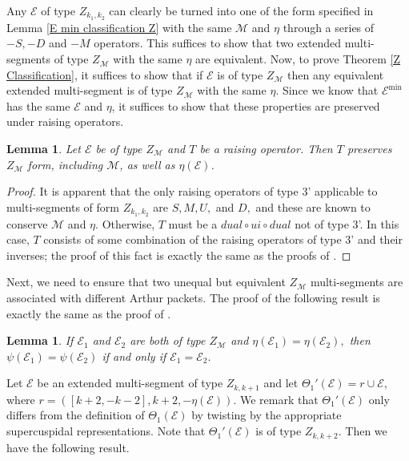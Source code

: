 \documentclass[11pt,letterpaper]{amsart}
\newcommand{\EE}{\mathcal{E}}
\newtheorem{lemma}[thm]{Lemma}
\numberwithin{equation}{section}
\begin{document}
Any $\mathcal{E}$ of type $Z_{k_1, k_2}$ can clearly be turned into one of the form specified in Lemma \ref{E min classification Z} with the same $\mathcal{M}$ and $\eta$ through a series of $-S, -D$ and $-M$ operators. This suffices to show that two extended multi-segments of type $Z_\mathcal{M}$ with the same $\eta$ are equivalent. Now, to prove Theorem \ref{Z Classification}, it suffices to show that if $\mathcal{E}$ is of type $Z_\mathcal{M}$ then any equivalent extended multi-segment is of type $Z_\mathcal{M}$ with the same $\eta.$ Since we know that $\mathcal{E}^{\min}$ has the same $\mathcal{E}$ and $\eta$, it suffices to show that these properties are preserved under raising operators.

\begin{lemma}
    Let $\mathcal{E}$ be of type $Z_\mathcal{M}$ and $T$ be a raising operator. Then $T$ preserves $Z_\mathcal{M}$ form, including $\mathcal{M}$, as well as $\eta(\mathcal{E})$.
\end{lemma}

\begin{proof}
    It is apparent that the only raising operators of type 3' applicable to multi-segments of form $Z_{k_1, k_2}$ are $S, M, U,$ and $D,$ and these are known to conserve $\mathcal{M}$ and $\eta.$ Otherwise, $T$ must be a $dual \circ ui \circ dual$ not of type 3'. In this case, $T$ consists of some combination of the raising operators of type 3' and their inverses; the proof of this fact is exactly the same as the proofs of \cite[Lemmas 5.47 and 5.48]{HKT26}.
\end{proof}

Next, we need to ensure that two unequal but equivalent $Z_\mathcal{M}$ multi-segments are associated with different Arthur packets. The proof of the following result is exactly the same as the proof of \cite[Lemma 6.1]{HKT26}.

\begin{lemma}
\label{packets distinct Z}
    If $\EE_1$ and $\EE_2$ are both of type $Z_\mathcal{M}$ and $\eta(\EE_1) = \eta(\EE_2),$ then $\psi(\EE_1) = \psi(\EE_2)$ if and only if $\EE_1 = \EE_2.$
\end{lemma}


Let $\mathcal{E}$ be an extended multi-segment of type $Z_{k, k + 1}$ and let $\Theta_1'(\mathcal{E}) = r \cup \mathcal{E},$ where $r = ([k + 2, -k - 2], k + 2, -\eta(\mathcal{E})).$ We remark that $\Theta_1'(\EE)$ only differs from the definition of $\Theta_1(\EE)$ by twisting by the appropriate supercuspidal representations. Note that $\Theta_1'(\mathcal{E})$ is of type $Z_{k, k + 2}.$ Then we have the following result.
\end{document}
